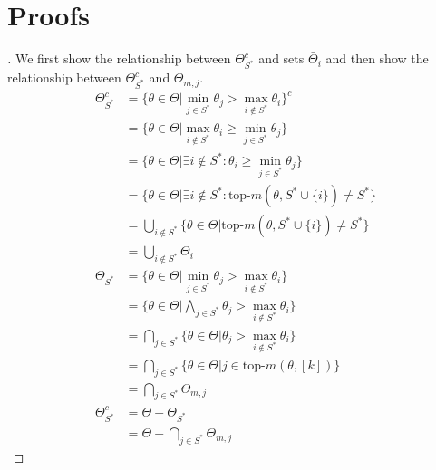 \section{Proofs}\label{section:optimal_proofs}
\begin{proof}[]
  We first show the relationship between $\Theta_{S^*}^c$ and sets
  $\bar{\Theta}_i$ and then show the relationship between $\Theta_{S^*}^c$ and
  $\Theta_{m, j}$.
  \begin{align}
    \Theta_{S^*}^c &= \{\theta \in \Theta | \min_{j \in S^*} \theta_j > \max_{i
        \notin S^*} \theta_i \}^c \\
    &= \{\theta \in \Theta | \max_{i \notin S^*} \theta_i \geq \min_{j \in S^*}
        \theta_j\} \\
    &= \{\theta \in \Theta | \exists i \notin S^*: \theta_i \geq \min_{j \in
        S^*} \theta_j\} \\
    &= \{\theta \in \Theta | \exists i \notin S^*: \text{top-}m(\theta, S^*
        \cup \{i\}) \neq S^*\} \\
    &= \bigcup_{i \notin S^*} \{\theta \in \Theta | \text{top-}m(\theta, S^*
        \cup \{i\}) \neq S^*\} \\
    &= \bigcup_{i \notin S^*} \bar{\Theta}_i \\
    \Theta_{S^*} &= \{\theta \in \Theta | \min_{j \in S^*} \theta_j > \max_{i
        \notin S^*} \theta_i\} \\
    &= \{\theta \in \Theta | \bigwedge_{j \in S^*} \theta_j > \max_{i \notin
        S^*} \theta_i\} \\
    &= \bigcap_{j \in S^*} \{\theta \in \Theta | \theta_j > \max_{i \notin S^*}
        \theta_i\} \\
    &= \bigcap_{j \in S^*} \{\theta \in \Theta | j \in \text{top-}m(\theta,
        [k])\} \\
    &= \bigcap_{j \in S^*} \Theta_{m, j} \\
    \Theta_{S^*}^c &= \Theta - \Theta_{S^*}\\
      &= \Theta - \bigcap_{j \in S^*} \Theta_{m, j}
  \end{align}
\end{proof}

